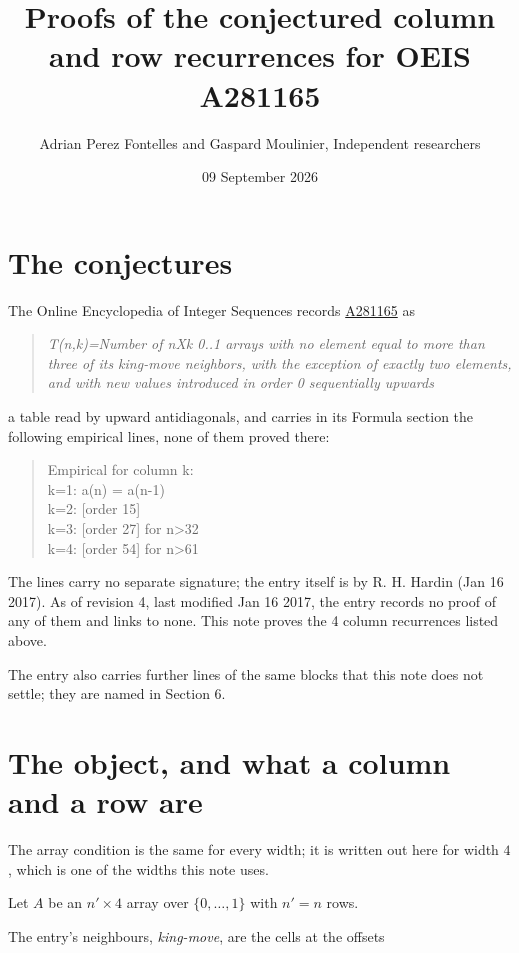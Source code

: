 \documentclass[11pt]{article}
\title{Proofs of the conjectured column and row recurrences for OEIS A281165}
\author{Adrian Perez Fontelles and Gaspard Moulinier, Independent researchers}
\date{09 September 2026}
\theoremstyle{definition}
\begin{document}
\maketitle
\section{The conjectures}

The Online Encyclopedia of Integer Sequences records \href{https://oeis.org/A281165}{A281165} as

\begin{quote}\itshape T(n,k)=Number of nXk 0..1 arrays with no element equal to more than three of its king-move neighbors, with the exception of exactly two elements, and with new values introduced in order 0 sequentially upwards\end{quote}

a table read by upward antidiagonals, and carries in its Formula section the following empirical lines, none of them proved there:

\begin{quote}\ttfamily Empirical for column k:\\
k=1: a(n) = a(n-1)\\k=2: [order 15]\\k=3: [order 27] for n>32\\k=4: [order 54] for n>61\end{quote}

The lines carry no separate signature; the entry itself is by R. H. Hardin (Jan 16 2017). As of revision 4, last modified Jan 16 2017, the entry records no proof of any of them and links to none. This note proves the 4 column recurrences listed above.

The entry also carries further lines of the same blocks that this note does not settle; they are named in Section 6.

\section{The object, and what a column and a row are}

The array condition is the same for every width; it is written out here for width $4$, which is one of the widths this note uses.

Let $A$ be an $n' \times 4$ array over $\{0,\dots,1\}$ with $n' = n$ rows.

The entry's neighbours, {\itshape king-move}, are the cells at the offsets
\end{document}
